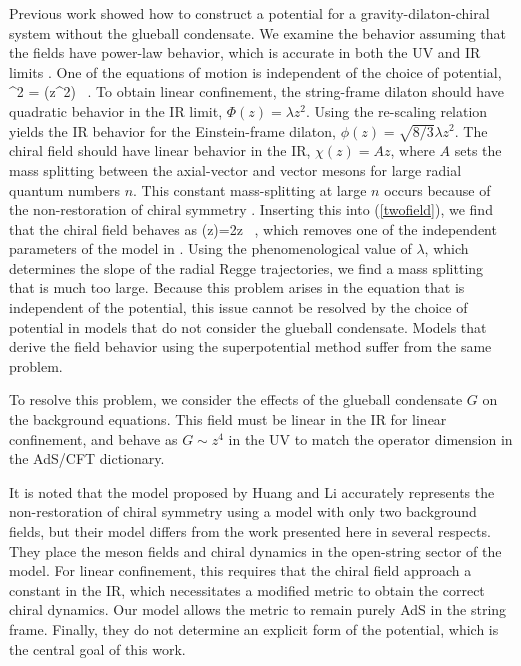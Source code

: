 Previous work showed how to construct a potential for a gravity-dilaton-chiral system without the glueball condensate. 
We examine the behavior assuming that the fields have power-law behavior, which is accurate in both the UV and IR limits \cite{Springer2010}. 
One of the equations of motion is independent of the choice of potential,
\be
\chidot^2  =  \Dz(z^2\phidot) \, . 
\label{twofield}
\ee
To obtain linear confinement, the string-frame dilaton should have quadratic behavior in the IR limit, $\Phi(z)=\lambda z^2$.
Using the re-scaling relation yields the IR behavior for the Einstein-frame dilaton, $\phi(z)=\sqrt{8/3} \lambda z^2$.
The chiral field should have linear behavior in the IR, $\chi(z)=A z$, where $A$ sets the mass splitting between the axial-vector and vector mesons for large radial quantum numbers $n$. 
This constant mass-splitting at large $n$ occurs because of the non-restoration of chiral symmetry \cite{Shifman-2008}.
Inserting this into (\ref{twofield}), we find that the chiral field behaves as
\be
\chi(z)=2\sqrt{6 \lambda}z \, ,
\ee
which removes one of the independent parameters of the model in \cite{gherghetta-kelley}. 
Using the phenomenological value of $\lambda$, which determines the slope of the radial Regge trajectories, we find a mass splitting that is much too large.
Because this problem arises in the equation that is independent of the potential, this issue cannot be resolved by the choice of potential in models that do not consider the glueball condensate. 
Models that derive the field behavior using the superpotential method suffer from the same problem.

To resolve this problem, we consider the effects of the glueball condensate $G$ on the background equations. 
This field must be linear in the IR for linear confinement, and behave as $G \sim z^4$ in the UV to match the operator dimension in the AdS/CFT dictionary.

It is noted that the model proposed by Huang and Li \cite{Li2013, Li2013a} accurately represents the non-restoration of chiral symmetry using a model with only two background fields, but their model differs from the work presented here in several respects.
They place the meson fields and chiral dynamics in the open-string sector of the model. 
For linear confinement, this requires that the chiral field approach a constant in the IR, which necessitates a modified metric to obtain the correct chiral dynamics.
Our model allows the metric to remain purely AdS in the string frame.
Finally, they do not determine an explicit form of the potential, which is the central goal of this work.

